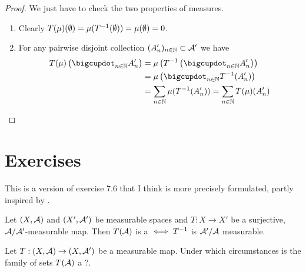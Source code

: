 \begin{proof}
	We just have to check the two properties of measures.
	\begin{enumerate}
		\item Clearly $T(\mu)(\emptyset) = \mu({T}^{-1}(\emptyset)) = \mu(\emptyset) = 0$.
		\item For any pairwise disjoint collection $(A_n')_{n \in \mathbb{N}} \subset \mathcal{A}'$ we have
		\begin{align*}
			T(\mu)\left(\bigcupdot_{n \in \N} A_n'\right) &= \mu\left(\inv{T}\left(\bigcupdot_{n\in\N} A_n'\right)\right)\\
			&= \mu\left(\bigcupdot_{n \in \N} \inv{T}( A_n')\right) \\
			&= \sum_{n \in \N} \mu(\inv{T}(A_n')) = \sum_{n \in \N} T(\mu)(A_n')
		\end{align*}
	\end{enumerate}
\end{proof}

\section{Exercises}

\begin{eg}
	This is a version of exercise 7.6 that I think is more precisely formulated, partly inspired by \cite{MO1}.
	
	Let $(X, \mathcal{A})$ and $(X', \mathcal{A}')$ be measurable spaces and $T: X \to X'$ be a surjective, $\mathcal{A}/\mathcal{A}'$-measurable map. Then $T(\mathcal{A})$ is a \siga $\iff {T}^{-1}$ is $\mathcal{A}'/\mathcal{A}$ measurable.
\end{eg}

\begin{ex}
	Let $T:(X, \mathcal{A}) \to (X, \mathcal{A}')$ be a measurable map. Under which circumstances is the family of sets $T(\mathcal{A})$ a \siga?.
\end{ex}

